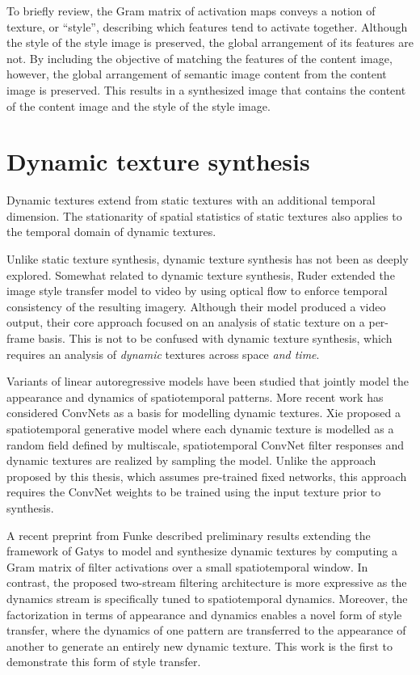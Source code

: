 To briefly review, the Gram matrix of activation maps conveys a notion of texture, or ``style'', describing which features tend to activate together. Although the style of the style image is preserved, the global arrangement of its features are not. By including the objective of matching the features of the content image, however, the global arrangement of semantic image content from the content image is preserved. This results in a synthesized image that contains the content of the content image and the style of the style image.

\section{Dynamic texture synthesis}

Dynamic textures extend from static textures with an additional temporal dimension. The stationarity of spatial statistics of static textures also applies to the temporal domain of dynamic textures.

Unlike static texture synthesis, dynamic texture synthesis has not been as deeply explored. Somewhat related to dynamic texture synthesis, Ruder \etal \cite{ruder2016} extended the image style transfer model to video by using
optical flow to enforce temporal consistency of the
resulting imagery. Although their model produced a video output, their core approach focused on an analysis of static texture on a per-frame basis. This is not to be confused with dynamic texture synthesis, which requires an analysis of \emph{dynamic} textures across space \emph{and time}.

Variants of linear autoregressive models have been studied
\cite{szummer1996,doretto2003} that jointly model the appearance and
dynamics of spatiotemporal patterns.
More recent work has considered ConvNets as a basis for modelling 
dynamic textures.
Xie \etal \cite{xie2017synthesizing} proposed a spatiotemporal
generative model where each dynamic texture is modelled as a random
field defined by multiscale, spatiotemporal ConvNet filter responses
and dynamic textures are realized by sampling the model.
Unlike the approach proposed by this thesis, which assumes pre-trained fixed networks,
this approach requires the ConvNet weights to be trained using the
input texture prior to synthesis.

A recent preprint from Funke \etal \cite{funke2017} described preliminary 
results extending the framework of Gatys \etal \cite{gatys2015} 
to model and  synthesize dynamic textures by computing a Gram 
matrix of filter activations over a small spatiotemporal window.
In contrast, the proposed two-stream filtering architecture is more 
expressive as the dynamics stream is specifically tuned to 
spatiotemporal dynamics.
Moreover, the factorization
in terms of appearance and dynamics enables a novel form of
style transfer, where the dynamics of one pattern are 
transferred to the appearance of another to generate an
entirely new dynamic texture.
This work is the first to demonstrate this form of style transfer.


